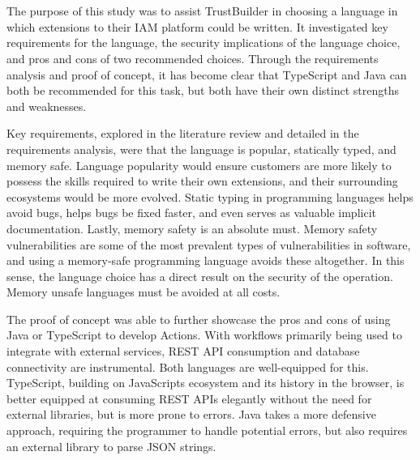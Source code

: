 
\chapter{}%
\label{ch:conclusie}


The purpose of this study was to assist TrustBuilder in choosing a language in which extensions to their IAM platform could be written. It investigated key requirements for the language, the security implications of the language choice, and pros and cons of two recommended choices.
Through the requirements analysis and proof of concept, it has become clear that TypeScript and Java can both be recommended for this task, but both have their own distinct strengths and weaknesses.

Key requirements, explored in the literature review and detailed in the requirements analysis, were that the language is popular, statically typed, and memory safe. Language popularity would ensure customers are more likely to possess the skills required to write their own extensions, and their surrounding ecosystems would be more evolved. Static typing in programming languages helps avoid bugs, helps bugs be fixed faster, and even serves as valuable implicit documentation. Lastly, memory safety is an absolute must. Memory safety vulnerabilities are some of the most prevalent types of vulnerabilities in software, and using a memory-safe programming language avoids these altogether. In this sense, the language choice has a direct result on the security of the operation. Memory unsafe languages must be avoided at all costs.

\vspace{11pt}

The proof of concept was able to further showcase the pros and cons of using Java or TypeScript to develop Actions. With workflows primarily being used to integrate with external services, REST API consumption and database connectivity are instrumental. Both languages are well-equipped for this. TypeScript, building on JavaScripts ecosystem and its history in the browser, is better equipped at consuming REST APIs elegantly without the need for external libraries, but is more prone to errors. Java takes a more defensive approach, requiring the programmer to handle potential errors, but also requires an external library to parse JSON strings.

